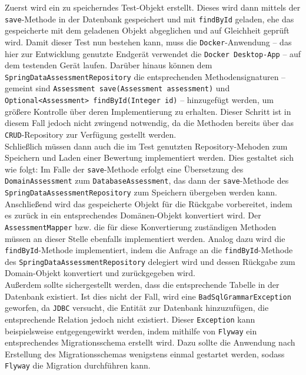 Zuerst wird ein zu speicherndes Test-Objekt erstellt. Dieses wird dann mittels der 
\texttt{save}-Methode in der Datenbank gespeichert und mit \texttt{findById} geladen, 
ehe das gespeicherte mit dem geladenen Objekt abgeglichen und auf Gleichheit geprüft 
wird. Damit dieser Test nun bestehen kann, muss die \texttt{Docker}-Anwendung -- 
das hier zur Entwicklung genutzte Endgerät verwendet die \texttt{Docker Desktop-App} -- 
auf dem testenden Gerät laufen. Darüber hinaus können dem 
\texttt{SpringDataAssessmentRepository} die entsprechenden Methodensignaturen -- 
gemeint sind \texttt{Assessment save(Assessment assessment)} und 
\texttt{Optional<Assessment> findById(Integer id)} -- hinzugefügt werden, um größere 
Kontrolle über deren Implementierung zu erhalten. Dieser Schritt ist in diesem Fall 
jedoch nicht zwingend notwendig, da die Methoden bereits über das 
\texttt{CRUD}-Repository zur Verfügung gestellt werden. \\ 
Schließlich müssen dann auch die im Test genutzten Repository-Mehoden zum Speichern 
und Laden einer Bewertung implementiert werden. Dies gestaltet sich wie folgt: Im 
Falle der \texttt{save}-Methode erfolgt eine Übersetzung des \texttt{DomainAssessment} 
zum \texttt{DatabaseAssessment}, das dann der \texttt{save}-Methode des 
\texttt{SpringDataAssessmentRepository} zum Speichern übergeben werden kann. 
Anschließend wird das gespeicherte Objekt für die Rückgabe vorbereitet, indem es 
zurück in ein entsprechendes Domänen-Objekt konvertiert wird. Der 
\texttt{AssessmentMapper} bzw. die für diese Konvertierung zuständigen Methoden 
müssen an dieser Stelle ebenfalls implementiert werden. Analog dazu wird die 
\texttt{findById}-Methode implementiert, indem die Anfrage an die 
\texttt{findById}-Methode des \texttt{SpringDataAssessmentRepository} delegiert wird 
und dessen Rückgabe zum Domain-Objekt konvertiert und zurückgegeben wird. \\ 
Außerdem sollte sichergestellt werden, dass die entsprechende Tabelle in der Datenbank 
existiert. Ist dies nicht der Fall, wird eine \texttt{BadSqlGrammarException} geworfen, 
da \texttt{JDBC} versucht, die Entität zur Datenbank hinzuzufügen, die entsprechende 
Relation jedoch nicht existiert. Dieser \texttt{Exception} kann beispielsweise 
entgegengewirkt werden, indem mithilfe von \texttt{Flyway} ein entsprechendes 
Migrationsschema erstellt wird. Dazu sollte die Anwendung nach Erstellung des 
Migrationsschemas wenigstens einmal gestartet werden, sodass \texttt{Flyway} die 
Migration durchführen kann. \\ 
